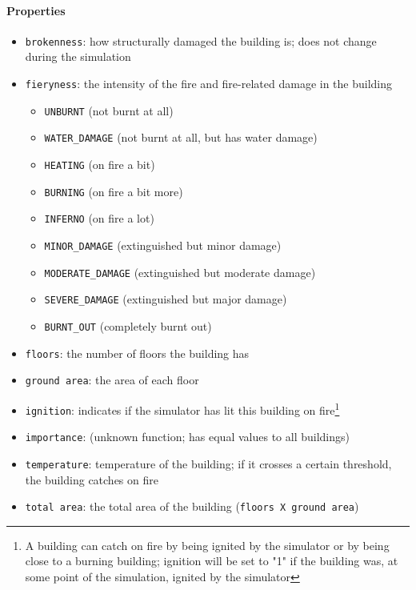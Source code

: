\documentclass{article}
\begin{document}
\paragraph{Properties}
\begin{itemize}
  \item \texttt{brokenness}: how structurally damaged the building is; does not change during the simulation
  \item \texttt{fieryness}: the intensity of the fire and fire-related damage in the building
  \begin{itemize}
    \item \texttt{UNBURNT} (not burnt at all)
    \item \texttt{WATER\_DAMAGE} (not burnt at all, but has water damage)
    \item \texttt{HEATING} (on fire a bit)
    \item \texttt{BURNING} (on fire a bit more)
    \item \texttt{INFERNO} (on fire a lot)
    \item \texttt{MINOR\_DAMAGE} (extinguished but minor damage)
    \item \texttt{MODERATE\_DAMAGE} (extinguished but moderate damage)
    \item \texttt{SEVERE\_DAMAGE} (extinguished but major damage)
    \item \texttt{BURNT\_OUT} (completely burnt out)
  \end{itemize}
  \item \texttt{floors}: the number of floors the building has
  \item \texttt{ground area}: the area of each floor
  \item \texttt{ignition}: indicates if the simulator has lit this building on fire\footnote{A building can catch on fire by being ignited by the simulator or by being close to a burning building; ignition will be set to "1" if the building was, at some point of the simulation, ignited by the simulator}
  \item \texttt{importance}: (unknown function; has equal values to all buildings)
  \item \texttt{temperature}: temperature of the building; if it crosses a certain threshold, the building catches on fire
  \item \texttt{total area}: the total area of the building (\texttt{floors X ground area})
\end{itemize}
\end{document}
